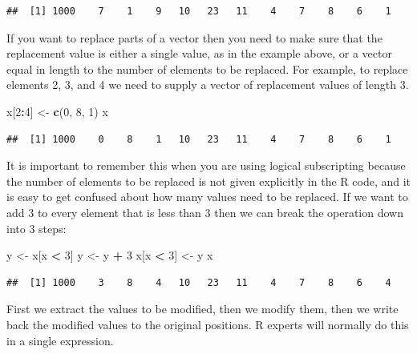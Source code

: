 \documentclass[
]{book}
\newenvironment{Shaded}{\begin{snugshade}}{\end{snugshade}}
\newcommand{\DecValTok}[1]{\textcolor[rgb]{0.00,0.00,0.81}{#1}}
\newcommand{\FunctionTok}[1]{\textcolor[rgb]{0.13,0.29,0.53}{\textbf{#1}}}
\newcommand{\NormalTok}[1]{#1}
\newcommand{\OtherTok}[1]{\textcolor[rgb]{0.56,0.35,0.01}{#1}}
\newcommand{\SpecialCharTok}[1]{\textcolor[rgb]{0.81,0.36,0.00}{\textbf{#1}}}
\begin{document}
\begin{verbatim}
##  [1] 1000    7    1    9   10   23   11    4    7    8    6    1
\end{verbatim}

If you want to replace parts of a vector then you need to make sure
that the replacement value is either a single value, as in the example
above, or a vector equal in length to the number of elements to be
replaced. For example, to replace elements 2, 3, and 4 we need to
supply a vector of replacement values of length 3.

\begin{Shaded}
\begin{Highlighting}[]
\NormalTok{x[}\DecValTok{2}\SpecialCharTok{:}\DecValTok{4}\NormalTok{] }\OtherTok{\textless{}{-}} \FunctionTok{c}\NormalTok{(}\DecValTok{0}\NormalTok{, }\DecValTok{8}\NormalTok{, }\DecValTok{1}\NormalTok{)}
\NormalTok{x}
\end{Highlighting}
\end{Shaded}

\begin{verbatim}
##  [1] 1000    0    8    1   10   23   11    4    7    8    6    1
\end{verbatim}

It is important to remember this when you are using logical
subscripting because the number of elements to be replaced is not
given explicitly in the R code, and it is easy to get confused about
how many values need to be replaced. If we want to add 3 to every
element that is less than 3 then we can break the operation down into
3 steps:

\begin{Shaded}
\begin{Highlighting}[]
\NormalTok{y }\OtherTok{\textless{}{-}}\NormalTok{ x[x }\SpecialCharTok{\textless{}} \DecValTok{3}\NormalTok{]}
\NormalTok{y }\OtherTok{\textless{}{-}}\NormalTok{ y }\SpecialCharTok{+} \DecValTok{3}
\NormalTok{x[x }\SpecialCharTok{\textless{}} \DecValTok{3}\NormalTok{] }\OtherTok{\textless{}{-}}\NormalTok{ y}
\NormalTok{x}
\end{Highlighting}
\end{Shaded}

\begin{verbatim}
##  [1] 1000    3    8    4   10   23   11    4    7    8    6    4
\end{verbatim}

First we extract the values to be modified, then we modify them, then we
write back the modified values to the original positions. R experts will
normally do this in a single expression.
\end{document}
